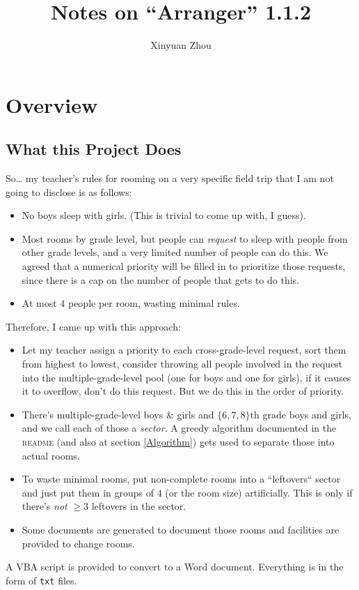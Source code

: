 \documentclass[openany,notitlepage]{book}
\makeatletter
\newcommand*{\toccontents}{\@starttoc{toc}}
\makeatother
\begin{document}
	\title{Notes on ``Arranger'' 1.1.2}
	\author{Xinyuan Zhou}
	\maketitle
	

	\toccontents
	
	\chapter{Overview}
	
	\section{What this Project Does}
	So\ldots{} my teacher's rules for rooming on a very specific field trip that I am not going to disclose is as follows:
	\begin{itemize}
		\item No boys sleep with girls. (This is trivial to come up with, I guess).
		\item Most rooms by grade level, but people can \emph{request} to sleep with people from other grade levels, and a very limited number of people can do this. We agreed that a numerical priority will be filled in to prioritize those requests, since there is a cap on the number of people that gets to do this.
		\item At most $4$ people per room, wasting minimal rules.
	\end{itemize}
	Therefore, I came up with this approach:
	\begin{itemize}
		\item Let my teacher assign a priority to each cross-grade-level request, sort them from highest to lowest, consider throwing all people involved in the request into the multiple-grade-level pool (one for boys and one for girls), if it causes it to overflow, don't do this request. But we do this in the order of priority.
		\item There's multiple-grade-level boys \& girls and $\{6,7,8\}$th grade boys and girls, and we call each of those a \emph{sector}. A greedy algorithm documented in the \textsc{readme} (and also at section \ref{Algorithm}) gets used to separate those into actual rooms.
		\item To waste minimal rooms, put non-complete rooms into a ``leftovers`` sector and just put them in groups of $4$ (or the room size) artificially. This is only if there's \emph{not} $\geq3$ leftovers in the sector.
		\item Some documents are generated to document those rooms and facilities are provided to change rooms.
	\end{itemize}
	A VBA script is provided to convert to a Word document. Everything is in the form of \verb+txt+ files.
	
\end{document}
